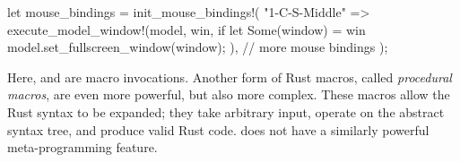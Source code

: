 \begin{rustblock}
  let mouse_bindings = init_mouse_bindings!(
    "1-C-S-Middle" => execute_model_window!(model, win,
      if let Some(window) = win {
        model.set_fullscreen_window(window);
      }
    ),
    // more mouse bindings
  );
\end{rustblock}

Here,  and  are macro
invocations. Another form of Rust macros, called \textit{procedural macros},
are even more powerful, but also more complex\cite{rustmacros}. These macros
allow the Rust syntax to be expanded; they take arbitrary input, operate on the
abstract syntax tree, and produce valid Rust code\cite{rustmacros}. \cpp does
not have a similarly powerful meta-programming feature\cite{cppstd}.


